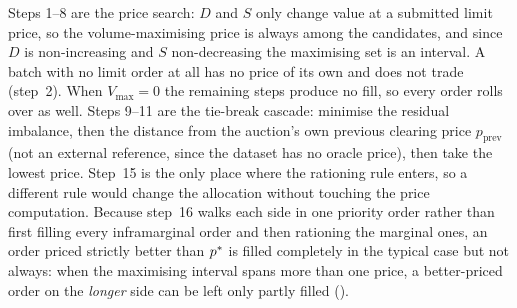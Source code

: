 Steps 1--8 are the price search: $D$ and $S$ only change value at a
submitted limit price, so the volume-maximising price is always among the
candidates, and since $D$ is non-increasing and $S$ non-decreasing the
maximising set is an interval. A batch with no limit order at all has no
price of its own and does not trade (step~2). When $V_{\max} = 0$ the
remaining steps produce no fill, so every order rolls over as well.
Steps 9--11 are the tie-break cascade: minimise the residual imbalance,
then the distance from the auction's own previous clearing price
$p_{\mathrm{prev}}$ (not an external reference, since the dataset has no
oracle price), then take the lowest price. Step~15 is the only place where
the rationing rule enters, so a different rule would change the allocation
without touching the price computation. Because step~16 walks each side in
one priority order rather than first filling every inframarginal order and
then rationing the marginal ones, an order priced strictly better than
$p^{\ast}$ is filled completely in the typical case but not always: when the
maximising interval spans more than one price, a better-priced order on the
\emph{longer} side can be left only partly filled ().
